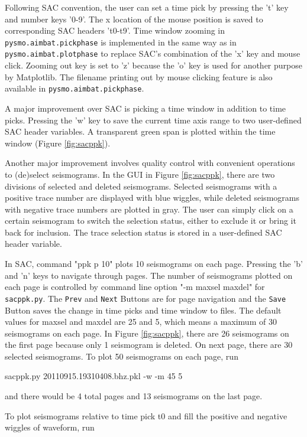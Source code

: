 \documentclass[12pt, titlepage]{article}
\newenvironment{lyxcode}
{\begin{list}{}{
\setlength{\rightmargin}{\leftmargin}
\setlength{\listparindent}{0pt}%
\raggedright
\setlength{\itemsep}{0pt}
\setlength{\parsep}{0pt}
\normalfont\ttfamily}%
 \item[]}
{\end{list}}
\begin{document}
Following SAC convention, the user can set a time pick by pressing the 't' key and number keys '0-9'. The x location of the mouse position is saved to corresponding SAC headers 't0-t9'. 
Time window zooming in \texttt{pysmo.aimbat.pickphase} is implemented in the same way as in \texttt{pysmo.aimbat.plotphase} to replace SAC's combination of the 'x' key and mouse click. 
Zooming out key is set to 'z' because the 'o' key is used for another purpose by Matplotlib.
The filename printing out by mouse clicking feature is also available in \texttt{pysmo.aimbat.pickphase}.

A major improvement over SAC is picking a time window in addition to time picks.
Pressing the 'w' key to save the current time axis range to two user-defined SAC header variables. A transparent green span is plotted within the time window (Figure \ref{fig:sacppk}).

Another major improvement involves quality control with convenient operations to (de)select seismograms.
In the GUI in Figure \ref{fig:sacppk}, there are two divisions of selected and deleted seismograms. 
Selected seismograms with a positive trace number are displayed with blue wiggles, while deleted seismograms with negative trace numbers are plotted in gray.
The user can simply click on a certain seismogram to switch the selection status, either to exclude it or bring it back for inclusion. The trace selection status is stored in a user-defined SAC header variable.

In SAC, command "ppk p 10" plots 10 seismograms on each page. Pressing the 'b' and 'n' keys to navigate through pages.
The number of seismograms plotted on each page is controlled by command line option "-m maxsel maxdel" for \texttt{sacppk.py}. The \texttt{Prev} and \texttt{Next} Buttons are for page navigation and the \texttt{Save} Button saves the change in time picks and time window to files.
The default values for maxsel and maxdel are 25 and 5, which means a maximum of 30 seismograms on each page. 
In Figure \ref{fig:sacppk}, there are 26 seismograms on the first page because only 1 seismogram is deleted. 
On next page, there are 30 selected seismograms. To plot 50 seismograms on each page, run


\begin{lyxcode}
sacppk.py 20110915.19310408.bhz.pkl -w -m 45 5
\end{lyxcode}

and there would be 4 total pages and 13 seismograms on the last page.


To plot seismograms relative to time pick t0 and fill the positive and negative wiggles of waveform, run
\end{document}
